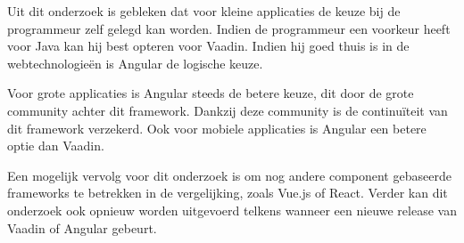 Uit dit onderzoek is gebleken dat voor kleine applicaties de keuze bij de programmeur zelf gelegd kan worden. Indien de programmeur een voorkeur heeft voor Java kan hij best opteren voor Vaadin. Indien hij goed thuis is in de webtechnologieën is Angular de logische keuze.

Voor grote applicaties is Angular steeds de betere keuze, dit door de grote community achter dit framework. Dankzij deze community is de continuïteit van dit framework verzekerd. Ook voor mobiele applicaties is Angular een betere optie dan Vaadin. 

Een mogelijk vervolg voor dit onderzoek is om nog andere component gebaseerde frameworks te betrekken in de vergelijking, zoals Vue.js of React. Verder kan dit onderzoek ook opnieuw worden uitgevoerd telkens wanneer een nieuwe release van Vaadin of Angular gebeurt. 

